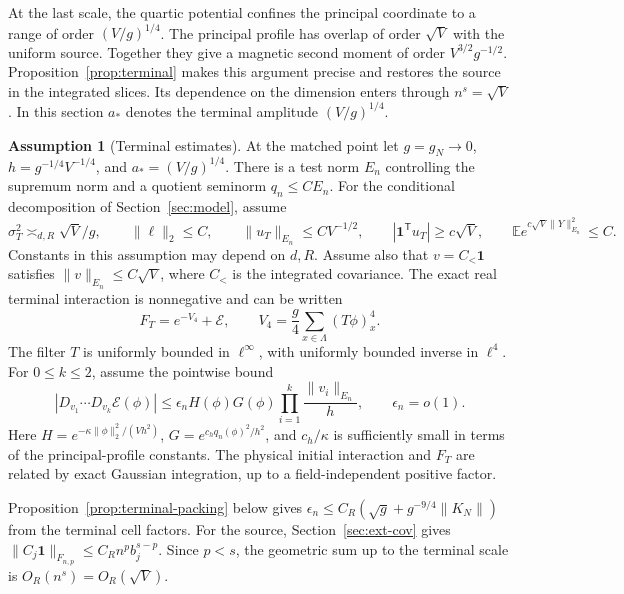 \documentclass[11pt]{article}
\theoremstyle{definition}
\newtheorem{assumption}[theorem]{Assumption}
\newcommand{\one}{\mathbf 1}
\newcommand{\E}{\mathbb E}
\begin{document}
At the last scale, the quartic potential confines the principal
coordinate to a range of order \((V/g)^{1/4}\). The principal profile
has overlap of order \(\sqrt V\) with the uniform source. Together they give a
magnetic second moment of order \(V^{3/2}g^{-1/2}\).
Proposition~\ref{prop:terminal} makes this argument precise and
restores the source in the integrated slices. Its dependence on the
dimension enters through \(n^s=\sqrt V\). In this section \(a_*\)
denotes the terminal amplitude \((V/g)^{1/4}\).

\begin{assumption}[Terminal estimates]\label{ass:terminal}
At the matched point let \(g=g_N\to0\),
\(h=g^{-1/4}V^{-1/4}\), and \(a_*=(V/g)^{1/4}\).
There is a test norm \(E_n\) controlling the supremum norm and a
quotient seminorm \(q_n\le C E_n\). For the conditional
decomposition of Section~\ref{sec:model}, assume
\begin{equation}
 \sigma_T^2\asymp_{d,R}\sqrt V/g,\qquad
 \|\ell\|_2\le C,\qquad
 \|u_T\|_{E_n}\le C V^{-1/2},\qquad
 |\one^{\mathsf T}u_T|\ge c\sqrt V,\qquad
 \E e^{c\sqrt V\|Y\|_{E_n}^2}\le C.
\end{equation}
Constants in this assumption may depend on \(d,R\). Assume also that
\(v=C_<\one\) satisfies \(\|v\|_{E_n}\le C\sqrt V\), where
\(C_<\) is the integrated covariance. The exact real terminal
interaction is nonnegative and can be written
\begin{equation}
 F_T=e^{-V_4}+\mathcal E,\qquad
 V_4=\frac g4\sum_{x\in\Lambda}(T\phi)_x^4 .
\end{equation}
The filter \(T\) is uniformly bounded in \(\ell^\infty\), with
uniformly bounded inverse in \(\ell^4\).
For \(0\le k\le2\), assume the pointwise bound
\begin{equation}
 |D_{v_1}\cdots D_{v_k}\mathcal E(\phi)|
 \le \epsilon_n H(\phi)G(\phi)\prod_{i=1}^k
      \frac{\|v_i\|_{E_n}}{h},\qquad \epsilon_n=o(1).
\end{equation}
Here \(H=e^{-\kappa\|\phi\|_2^2/(Vh^2)}\),
\(G=e^{c_h q_n(\phi)^2/h^2}\), and \(c_h/\kappa\) is sufficiently small in terms of the
principal-profile constants. The physical initial interaction
and \(F_T\) are related by exact Gaussian integration, up to a
field-independent positive factor.
\end{assumption}

Proposition~\ref{prop:terminal-packing} below gives
\(\epsilon_n\le C_R(\sqrt g+g^{-9/4}\|K_N\|)\) from the terminal
cell factors. For the source, Section~\ref{sec:ext-cov} gives
\(\|C_j\one\|_{F_{n,p}}\le C_R n^p b_j^{s-p}\).
Since \(p<s\), the geometric sum up to the terminal scale is
\(O_R(n^s)=O_R(\sqrt V)\).
\end{document}
